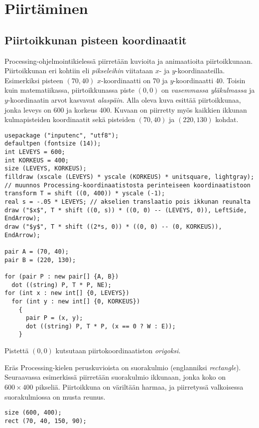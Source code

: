 \documentclass[11pt]{article}
\author{Reima}
\date{\today}
\title{}
\begin{document}
\section*{Piirtäminen}
\label{sec:org4ed876c}
\subsection*{Piirtoikkunan pisteen koordinaatit}
\label{sec:orgf67c38d}

Processing-ohjelmointikielessä piirretään kuvioita ja animaatioita
piirtoikkunaan. Piirtoikkunan eri kohtiin eli \emph{pikseleihin}
viitataan \(x\)- ja \(y\)-koordinaateilla. Esimerkiksi pisteen
\((70, 40)\) \(x\)-koordinaatti on 70 ja
\(y\)-koordinaatti 40. Toisin kuin matematiikassa, piirtoikkunassa
piste \((0, 0)\) on \emph{vasemmassa yläkulmassa} ja \(y\)-koordinaatin
arvot kasvavat \emph{alaspäin}. Alla oleva kuva esittää piirtoikkunaa,
jonka leveys on 600 ja korkeus 400. Kuvaan on piirretty myös
kaikkien ikkunan kulmapisteiden koordinaatit sekä pisteiden \((70,
   40)\) ja \((220, 130)\) kohdat.


\begin{verbatim}
usepackage ("inputenc", "utf8");
defaultpen (fontsize (14));
int LEVEYS = 600;
int KORKEUS = 400;
size (LEVEYS, KORKEUS);
filldraw (xscale (LEVEYS) * yscale (KORKEUS) * unitsquare, lightgray);
// muunnos Processing-koordinaatistosta perinteiseen koordinaatistoon
transform T = shift ((0, 400)) * yscale (-1); 
real s = -.05 * LEVEYS; // akselien translaatio pois ikkunan reunalta
draw ("$x$", T * shift ((0, s)) * ((0, 0) -- (LEVEYS, 0)), LeftSide, EndArrow);
draw ("$y$", T * shift ((2*s, 0)) * ((0, 0) -- (0, KORKEUS)), EndArrow);

pair A = (70, 40);
pair B = (220, 130);

for (pair P : new pair[] {A, B})
  dot ((string) P, T * P, NE);
for (int x : new int[] {0, LEVEYS})
  for (int y : new int[] {0, KORKEUS})
    {
      pair P = (x, y);
      dot ((string) P, T * P, (x == 0 ? W : E));
    }
\end{verbatim}

Pistettä \((0, 0)\) kutsutaan piirtokoordinaatiston \emph{origoksi}. 

Eräs Processing-kielen peruskuvioista on suorakulmio (englanniksi
\emph{rectangle}). Seuraavassa esimerkissä piirretään suorakulmio
ikkunaan, jonka koko on \(600\times 400\) pikseliä. Piirtoikkuna on
väriltään harmaa, ja piirretyssä valkoisessa suorakulmiossa on
musta reunus.
\begin{verbatim}
size (600, 400);
rect (70, 40, 150, 90);
\end{verbatim}
\end{document}
